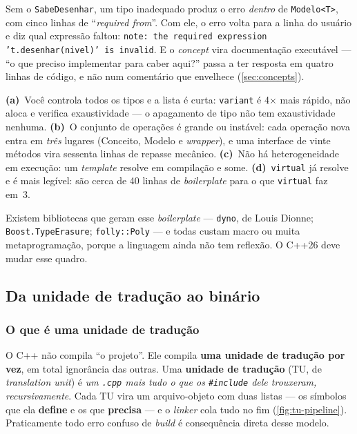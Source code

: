 \begin{porque}
Sem o \texttt{SabeDesenhar}, um tipo inadequado produz o erro \emph{dentro} de
\texttt{Modelo<T>}, com cinco linhas de ``\emph{required from}''. Com ele, o
erro volta para a linha do usuário e diz qual expressão faltou: \texttt{note:
the required expression 't.desenhar(nivel)' is invalid}. E o \emph{concept} vira
documentação executável --- ``o que preciso implementar para caber aqui?'' passa
a ter resposta em quatro linhas de código, e não num comentário que envelhece
(\cref{sec:concepts}).
\end{porque}

\begin{armadilha}
\textbf{(a)}~Você controla todos os tipos e a lista é curta: \texttt{variant} é
4× mais rápido, não aloca e verifica exaustividade --- o apagamento de tipo não
tem exaustividade nenhuma. \textbf{(b)}~O conjunto de operações é grande ou
instável: cada operação nova entra em \emph{três} lugares (Conceito, Modelo e
\emph{wrapper}), e uma interface de vinte métodos vira sessenta linhas de
repasse mecânico. \textbf{(c)}~Não há heterogeneidade em execução: um
\emph{template} resolve em compilação e some. \textbf{(d)}~\texttt{virtual} já
resolve e é mais legível: são cerca de 40 linhas de \emph{boilerplate} para o
que \texttt{virtual} faz em~3.
\end{armadilha}

Existem bibliotecas que geram esse \emph{boilerplate} --- \texttt{dyno}, de
Louis Dionne; \texttt{Boost.TypeErasure}; \texttt{folly::Poly} --- e todas custam
macro ou muita metaprogramação, porque a linguagem ainda não tem reflexão. O
C++26 deve mudar esse quadro.

\subsection{Da unidade de tradução ao binário}
\label{sec:linkage}

\subsubsection{O que é uma unidade de tradução}

O C++ não compila ``o projeto''. Ele compila \textbf{uma unidade de tradução por
vez}, em total ignorância das outras. Uma \textbf{unidade de tradução} (TU, de
\emph{translation unit}) é \emph{um \texttt{.cpp} mais tudo o que os
\texttt{\#include} dele trouxeram, recursivamente}. Cada TU vira um
arquivo-objeto com duas listas --- os símbolos que ela \textbf{define} e os que
\textbf{precisa} --- e o \emph{linker} cola tudo no fim
(\cref{fig:tu-pipeline}). Praticamente todo erro confuso de \emph{build} é
consequência direta desse modelo.

